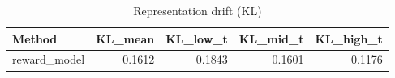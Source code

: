\begin{table}[htbp]
\centering
\caption{Representation drift (KL)}
\label{tab:repr-drift}
\begin{tabular}{lrrrr}
\toprule
\textbf{Method} & \textbf{KL\_mean} & \textbf{KL\_low\_t} & \textbf{KL\_mid\_t} & \textbf{KL\_high\_t} \\
\midrule
reward\_model & 0.1612 & 0.1843 & 0.1601 & 0.1176 \\
\bottomrule
\end{tabular}
\end{table}